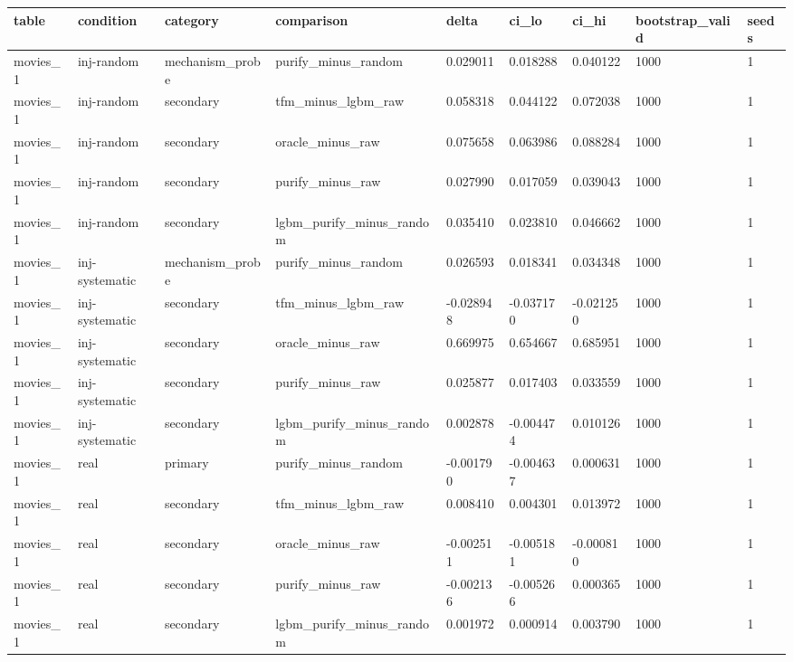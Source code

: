\begin{tabular}{lllllllll}
\hline
table & condition & category & comparison & delta & ci\_lo & ci\_hi & bootstrap\_valid & seeds \\
\hline
movies\_1 & inj-random & mechanism\_probe & purify\_minus\_random & 0.029011 & 0.018288 & 0.040122 & 1000 & 1 \\
movies\_1 & inj-random & secondary & tfm\_minus\_lgbm\_raw & 0.058318 & 0.044122 & 0.072038 & 1000 & 1 \\
movies\_1 & inj-random & secondary & oracle\_minus\_raw & 0.075658 & 0.063986 & 0.088284 & 1000 & 1 \\
movies\_1 & inj-random & secondary & purify\_minus\_raw & 0.027990 & 0.017059 & 0.039043 & 1000 & 1 \\
movies\_1 & inj-random & secondary & lgbm\_purify\_minus\_random & 0.035410 & 0.023810 & 0.046662 & 1000 & 1 \\
movies\_1 & inj-systematic & mechanism\_probe & purify\_minus\_random & 0.026593 & 0.018341 & 0.034348 & 1000 & 1 \\
movies\_1 & inj-systematic & secondary & tfm\_minus\_lgbm\_raw & -0.028948 & -0.037170 & -0.021250 & 1000 & 1 \\
movies\_1 & inj-systematic & secondary & oracle\_minus\_raw & 0.669975 & 0.654667 & 0.685951 & 1000 & 1 \\
movies\_1 & inj-systematic & secondary & purify\_minus\_raw & 0.025877 & 0.017403 & 0.033559 & 1000 & 1 \\
movies\_1 & inj-systematic & secondary & lgbm\_purify\_minus\_random & 0.002878 & -0.004474 & 0.010126 & 1000 & 1 \\
movies\_1 & real & primary & purify\_minus\_random & -0.001790 & -0.004637 & 0.000631 & 1000 & 1 \\
movies\_1 & real & secondary & tfm\_minus\_lgbm\_raw & 0.008410 & 0.004301 & 0.013972 & 1000 & 1 \\
movies\_1 & real & secondary & oracle\_minus\_raw & -0.002511 & -0.005181 & -0.000810 & 1000 & 1 \\
movies\_1 & real & secondary & purify\_minus\_raw & -0.002136 & -0.005266 & 0.000365 & 1000 & 1 \\
movies\_1 & real & secondary & lgbm\_purify\_minus\_random & 0.001972 & 0.000914 & 0.003790 & 1000 & 1 \\
\hline
\end{tabular}
